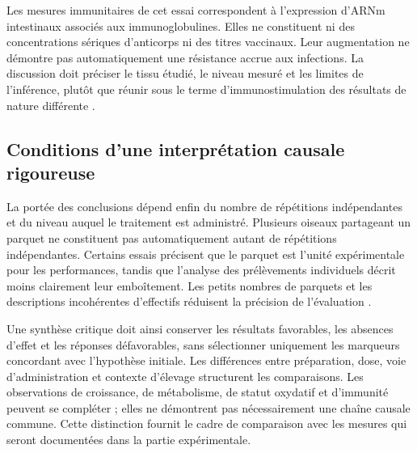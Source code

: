 Les mesures immunitaires de cet essai correspondent à l'expression d'ARNm intestinaux associés aux immunoglobulines. Elles ne constituent ni des concentrations sériques d'anticorps ni des titres vaccinaux. Leur augmentation ne démontre pas automatiquement une résistance accrue aux infections. La discussion doit préciser le tissu étudié, le niveau mesuré et les limites de l'inférence, plutôt que réunir sous le terme d'immunostimulation des résultats de nature différente \citep{Alfifi2025}.

\subsection{Conditions d'une interprétation causale rigoureuse}

La portée des conclusions dépend enfin du nombre de répétitions indépendantes et du niveau auquel le traitement est administré. Plusieurs oiseaux partageant un parquet ne constituent pas automatiquement autant de répétitions indépendantes. Certains essais précisent que le parquet est l'unité expérimentale pour les performances, tandis que l'analyse des prélèvements individuels décrit moins clairement leur emboîtement. Les petits nombres de parquets et les descriptions incohérentes d'effectifs réduisent la précision de l'évaluation \citep{Erener2020,Pirman2021,Mahasneh2024}.

Une synthèse critique doit ainsi conserver les résultats favorables, les absences d'effet et les réponses défavorables, sans sélectionner uniquement les marqueurs concordant avec l'hypothèse initiale. Les différences entre préparation, dose, voie d'administration et contexte d'élevage structurent les comparaisons. Les observations de croissance, de métabolisme, de statut oxydatif et d'immunité peuvent se compléter ; elles ne démontrent pas nécessairement une chaîne causale commune. Cette distinction fournit le cadre de comparaison avec les mesures qui seront documentées dans la partie expérimentale.

